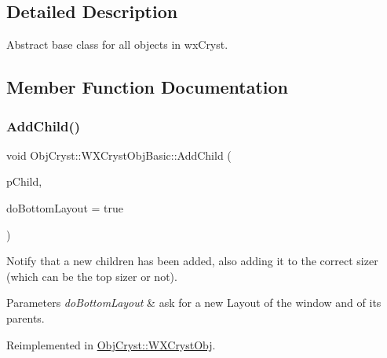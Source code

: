 \subsection{Detailed Description}
Abstract base class for all objects in wx\+Cryst. 

\subsection{Member Function Documentation}
\mbox{\label{class_obj_cryst_1_1_w_x_cryst_obj_basic_a9f40abffff18b23ca2c616fdb8ad6dd6}} 
\subsubsection{\texorpdfstring{AddChild()}{AddChild()}}
{\footnotesize\ttfamily void Obj\+Cryst\+::\+W\+X\+Cryst\+Obj\+Basic\+::\+Add\+Child (\begin{DoxyParamCaption}\item[{\mbox{\hyperlink{class_obj_cryst_1_1_w_x_cryst_obj_basic}{W\+X\+Cryst\+Obj\+Basic}} $\ast$}]{p\+Child,  }\item[{bool}]{do\+Bottom\+Layout = {\ttfamily true} }\end{DoxyParamCaption})\hspace{0.3cm}{\ttfamily [virtual]}}

Notify that a new children has been added, also adding it to the correct sizer (which can be the top sizer or not).


\begin{DoxyParams}{Parameters}
{\em do\+Bottom\+Layout} & ask for a new Layout of the window and of its parents. \\
\hline
\end{DoxyParams}


Reimplemented in \mbox{\hyperlink{class_obj_cryst_1_1_w_x_cryst_obj_a2d79799836e2138925a55b66601bbfe3}{Obj\+Cryst\+::\+W\+X\+Cryst\+Obj}}.

\mbox{\label{class_obj_cryst_1_1_w_x_cryst_obj_basic_a7ac00ae2ae28f1a6fa26e6fa571186b6}} 
